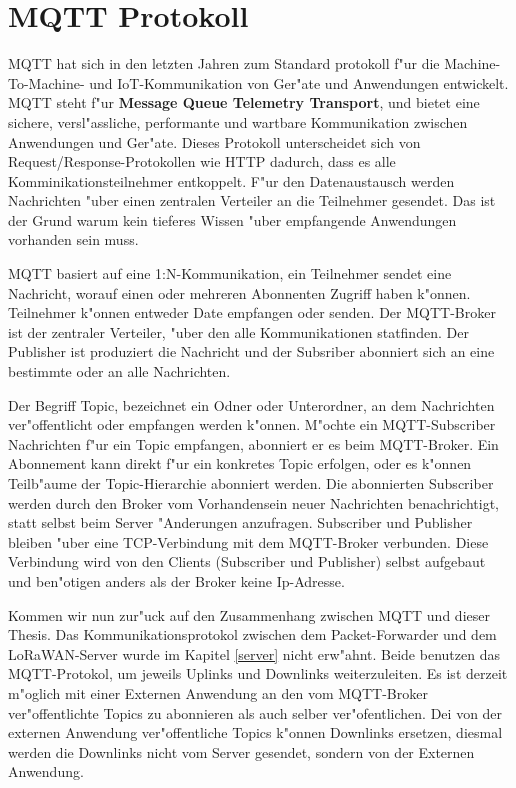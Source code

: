 \section{MQTT Protokoll}

MQTT hat sich in den letzten Jahren zum Standard protokoll f"ur die
Machine-To-Machine- und IoT-Kommunikation von Ger"ate und Anwendungen
entwickelt. MQTT steht f"ur \textbf{Message Queue Telemetry Transport},
und bietet eine sichere, versl"assliche, performante und wartbare
Kommunikation zwischen Anwendungen und Ger"ate. Dieses Protokoll
unterscheidet sich von Request/Response-Protokollen wie HTTP dadurch,
dass es alle Komminikationsteilnehmer entkoppelt. F"ur den
Datenaustausch werden Nachrichten "uber einen zentralen Verteiler an die
Teilnehmer gesendet. Das ist der Grund warum kein tieferes Wissen "uber
empfangende Anwendungen vorhanden sein muss.

MQTT basiert auf eine 1:N-Kommunikation, ein Teilnehmer sendet eine
Nachricht, worauf einen oder mehreren Abonnenten Zugriff haben k"onnen.
Teilnehmer k"onnen entweder Date empfangen oder senden. Der MQTT-Broker
ist der zentraler Verteiler, "uber den alle Kommunikationen statfinden.
Der Publisher ist produziert die Nachricht und der Subsriber abonniert
sich an eine bestimmte oder an alle Nachrichten. 

Der Begriff  Topic, bezeichnet ein Odner oder Unterordner, an dem
Nachrichten ver"offentlicht oder empfangen werden k"onnen. M"ochte ein
MQTT-Subscriber Nachrichten f"ur ein Topic empfangen, abonniert er es
beim MQTT-Broker. Ein Abonnement kann direkt f"ur ein konkretes Topic
erfolgen, oder es k"onnen Teilb"aume der Topic-Hierarchie abonniert
werden. Die abonnierten Subscriber werden durch den Broker vom
Vorhandensein neuer Nachrichten benachrichtigt, statt selbst beim Server
"Anderungen anzufragen. Subscriber und Publisher bleiben "uber eine
TCP-Verbindung mit dem MQTT-Broker verbunden. Diese Verbindung wird von
den Clients (Subscriber und Publisher) selbst aufgebaut und ben"otigen 
anders als der Broker keine Ip-Adresse. 

Kommen wir nun zur"uck auf den Zusammenhang zwischen MQTT und dieser
Thesis. Das Kommunikationsprotokol zwischen dem Packet-Forwarder und dem
LoRaWAN-Server wurde im Kapitel \ref{server} nicht erw"ahnt. Beide
benutzen das MQTT-Protokol, um jeweils Uplinks und Downlinks
weiterzuleiten. Es ist derzeit m"oglich mit einer Externen Anwendung an
den vom MQTT-Broker ver"offentlichte Topics zu abonnieren als auch 
selber ver"ofentlichen. Dei von der externen Anwendung ver"offentliche 
Topics k"onnen Downlinks ersetzen, diesmal werden die Downlinks nicht 
vom Server gesendet, sondern von der Externen Anwendung.

